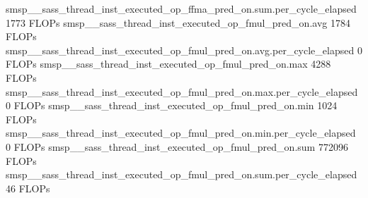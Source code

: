 smsp__sass_thread_inst_executed_op_ffma_pred_on.sum.per_cycle_elapsed                       1773 FLOPs
smsp__sass_thread_inst_executed_op_fmul_pred_on.avg                                         1784 FLOPs
smsp__sass_thread_inst_executed_op_fmul_pred_on.avg.per_cycle_elapsed                          0 FLOPs
smsp__sass_thread_inst_executed_op_fmul_pred_on.max                                         4288 FLOPs
smsp__sass_thread_inst_executed_op_fmul_pred_on.max.per_cycle_elapsed                          0 FLOPs
smsp__sass_thread_inst_executed_op_fmul_pred_on.min                                         1024 FLOPs
smsp__sass_thread_inst_executed_op_fmul_pred_on.min.per_cycle_elapsed                          0 FLOPs
smsp__sass_thread_inst_executed_op_fmul_pred_on.sum                                       772096 FLOPs
smsp__sass_thread_inst_executed_op_fmul_pred_on.sum.per_cycle_elapsed                         46 FLOPs


